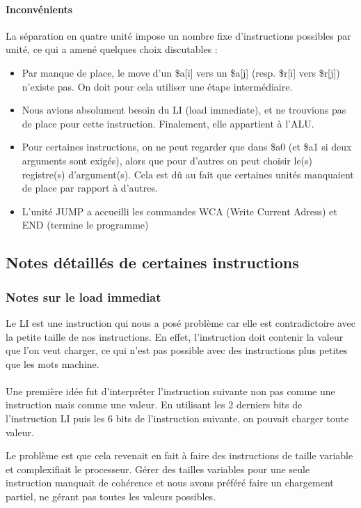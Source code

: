 \documentclass{article}
\begin{document}
\paragraph{Inconvénients}
La séparation en quatre unité impose un nombre fixe d'instructions possibles
par unité, ce qui a amené quelques choix discutables :
\begin{itemize}
  \item Par manque de place, le move d'un \$a[i] vers un \$a[j]
    (resp. \$r[i] vers \$r[j]) n'existe pas. On doit pour cela utiliser une
    étape intermédiaire.
  \item Nous avions absolument besoin du LI (load immediate), et ne trouvions
    pas de place pour cette instruction. Finalement, elle appartient à l'ALU.
  \item Pour certaines instructions, on ne peut regarder que dans \$a0 (et \$a1
    si deux arguments sont exigés), alors que pour d'autres on peut choisir
    le(s) registre(s) d'argument(s). Cela est dû au fait que certaines unités
    manquaient de place par rapport à d'autres.
  \item L'unité JUMP a accueilli les commandes WCA (Write Current Adress) et
    END (termine le programme)
\end{itemize}

\subsection{Notes détaillés de certaines instructions}

\subsubsection{Notes sur le load immediat}
Le LI est une instruction qui nous a posé problème car elle est contradictoire
avec la petite taille de nos instructions. En effet, l'instruction doit contenir
la valeur que l'on veut charger, ce qui n'est pas possible avec des instructions
plus petites que les mots machine.

\paragraph{}
Une première idée fut d'interpréter l'instruction suivante non pas comme une
instruction mais comme une valeur. En utilisant les 2 derniers bits de l'instruction
LI puis les 6 bits de l'instruction suivante, on pouvait charger toute valeur.

Le problème est que cela revenait en fait à faire des instructions de taille variable
et complexifiait le processeur. Gérer des tailles variables pour une seule instruction
manquait de cohérence et nous avons préféré faire un chargement partiel, ne gérant
pas toutes les valeurs possibles.
\end{document}
